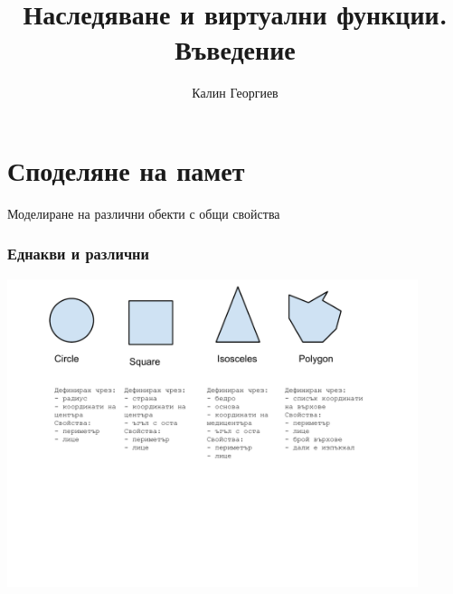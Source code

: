 \documentclass{beamer}
\begin{document}
\title[Обектно ориентирано програмиране]{Наследяване и виртуални функции. Въведение}
\author{Калин Георгиев}
\frame{\titlepage}

\section{Споделяне на памет}


\begin{frame}
\centerline{Моделиране на различни обекти с общи свойства}
\end{frame}


\begin{frame}[fragile]
\frametitle{Еднакви и различни}

\begin{center}
\includegraphics[width=12.0cm]{images/figures}
\end{center}


\end{frame}
\end{document}

